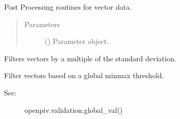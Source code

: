 \documentclass[letterpaper,10pt,english]{sphinxmanual}
\begin{document}
\begin{fulllineitems}
\label{\detokenize{postprocessing:openpivgui.PostProcessing.PostProcessing}}
Post Processing routines for vector data.
\begin{quote}\begin{description}
\item[{Parameters}] \leavevmode
{} () \textendash{} Parameter object.

\end{description}\end{quote}

\begin{fulllineitems}
\label{\detokenize{postprocessing:openpivgui.PostProcessing.PostProcessing.global_std}}
Filters vectors by a multiple of the standard deviation.







\end{fulllineitems}


\begin{fulllineitems}
\label{\detokenize{postprocessing:openpivgui.PostProcessing.PostProcessing.global_val}}
Filter vectors based on a global min\sphinxhyphen{}max threshold.
\begin{description}
\item[{See:}] \leavevmode
openpiv.validation.global\_val()

\end{description}

\end{fulllineitems}


\end{fulllineitems}
\end{document}
